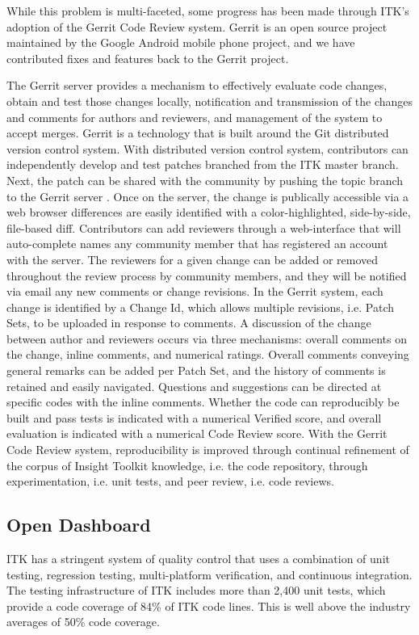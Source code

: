 \documentclass{frontiersENG} %
\begin{document}
While this problem is multi-faceted, some progress has been made through ITK’s adoption of the Gerrit Code Review system.  Gerrit is an open source project maintained by the Google Android mobile phone project, and we have contributed fixes and features back to the Gerrit project.

The Gerrit server provides a mechanism to effectively evaluate code changes, obtain and test those changes locally, notification and transmission of the changes and comments for authors and reviewers, and management of the system to accept merges.  Gerrit is a technology that is built around the Git distributed version control system.  With distributed version control system, contributors can independently develop and test patches branched from the ITK master branch. Next, the patch can be shared with the community by pushing the topic branch to the Gerrit server \cite{ITKGerrit}.  Once on the server, the change is publically accessible via a web browser differences are easily identified with a color-highlighted, side-by-side, file-based diff.  Contributors can add reviewers through a web-interface that will auto-complete names any community member that has registered an account with the server.  The reviewers for a given change can be added or removed throughout the review process by community members, and they will be notified via email any new comments or change revisions.  In the Gerrit system, each change is identified by a Change Id, which allows multiple revisions, i.e. Patch Sets, to be uploaded in response to comments.  A discussion of the change between author and reviewers occurs via three mechanisms: overall comments on the change, inline comments, and numerical ratings.  Overall comments conveying general remarks can be added per Patch Set, and the history of comments is retained and easily navigated. Questions and suggestions can be directed at specific codes with the inline comments.  Whether the code can reproducibly be built and pass tests is indicated with a numerical Verified score, and overall evaluation is indicated with a numerical Code Review score.  With the Gerrit Code Review system, reproducibility is improved through continual refinement of the corpus of Insight Toolkit knowledge, i.e. the code repository, through experimentation, i.e. unit tests, and peer review, i.e. code reviews.

\subsection{Open Dashboard}
ITK has a stringent system of quality control that uses a combination of unit testing, regression testing, multi-platform verification, and continuous integration. The testing infrastructure of ITK includes more than 2,400 unit tests, which provide a code coverage of 84\% of ITK code lines. This is well above the industry averages of 50\% code coverage.
\end{document}
